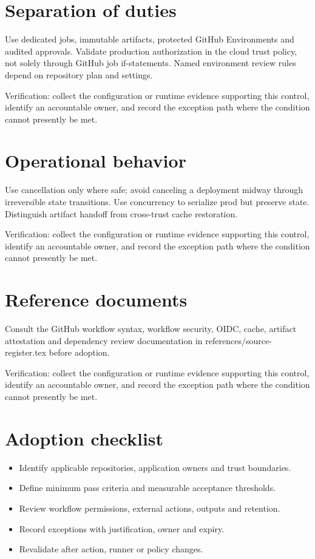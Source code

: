 \documentclass[11pt,letterpaper]{article}
\begin{document}
\section{Separation of duties}
Use dedicated jobs, immutable artifacts, protected GitHub Environments and audited approvals. Validate production authorization in the cloud trust policy, not solely through GitHub job if-statements. Named environment review rules depend on repository plan and settings.

Verification: collect the configuration or runtime evidence supporting this control, identify an accountable owner, and record the exception path where the condition cannot presently be met.

\section{Operational behavior}
Use cancellation only where safe; avoid canceling a deployment midway through irreversible state transitions. Use concurrency to serialize prod but preserve state. Distinguish artifact handoff from cross-trust cache restoration.

Verification: collect the configuration or runtime evidence supporting this control, identify an accountable owner, and record the exception path where the condition cannot presently be met.

\section{Reference documents}
Consult the GitHub workflow syntax, workflow security, OIDC, cache, artifact attestation and dependency review documentation in references/source-register.tex before adoption.

Verification: collect the configuration or runtime evidence supporting this control, identify an accountable owner, and record the exception path where the condition cannot presently be met.

\section{Adoption checklist}
\begin{itemize}
\item Identify applicable repositories, application owners and trust boundaries.
\item Define minimum pass criteria and measurable acceptance thresholds.
\item Review workflow permissions, external actions, outputs and retention.
\item Record exceptions with justification, owner and expiry.
\item Revalidate after action, runner or policy changes.
\end{itemize}
\end{document}
